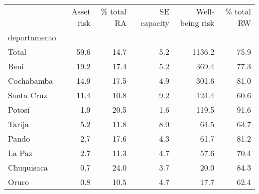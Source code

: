 \begin{tabular}{lrrrrr}
\toprule
{} &  Asset risk &  \% total RA &  SE capacity &  Well-being risk &  \% total RW \\
departamento &             &             &              &                  &             \\
\midrule
Total        &        59.6 &        14.7 &          5.2 &           1136.2 &        75.9 \\
Beni         &        19.2 &        17.4 &          5.2 &            369.4 &        77.3 \\
Cochabamba   &        14.9 &        17.5 &          4.9 &            301.6 &        81.0 \\
Santa Cruz   &        11.4 &        10.8 &          9.2 &            124.4 &        60.6 \\
Potosí       &         1.9 &        20.5 &          1.6 &            119.5 &        91.6 \\
Tarija       &         5.2 &        11.8 &          8.0 &             64.5 &        63.7 \\
Pando        &         2.7 &        17.6 &          4.3 &             61.7 &        81.2 \\
La Paz       &         2.7 &        11.3 &          4.7 &             57.6 &        70.4 \\
Chuquisaca   &         0.7 &        24.0 &          3.7 &             20.0 &        84.3 \\
Oruro        &         0.8 &        10.5 &          4.7 &             17.7 &        62.4 \\
\bottomrule
\end{tabular}
